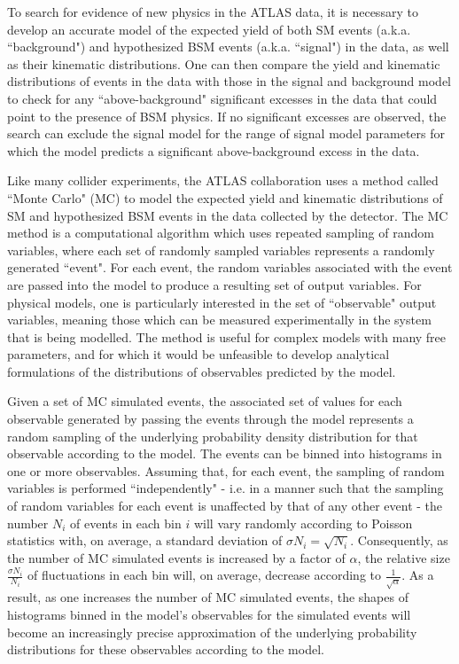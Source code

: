 \label{chapter:mc}

To search for evidence of new physics in the ATLAS data, it is necessary to develop an accurate model of the expected yield of both SM events (a.k.a. ``background") and hypothesized BSM events (a.k.a. ``signal") in the data, as well as their kinematic distributions. One can then compare the yield and kinematic distributions of events in the data with those in the signal and background model to check for any ``above-background" significant excesses in the data that could point to the presence of BSM physics. If no significant excesses are observed, the search can exclude the signal model for the range of signal model parameters for which the model predicts a significant above-background excess in the data.

Like many collider experiments, the ATLAS collaboration uses a method called ``Monte Carlo" (MC) to model the expected yield and kinematic distributions of SM and hypothesized BSM events in the data collected by the detector. The MC method is a computational algorithm which uses repeated sampling of random variables, where each set of randomly sampled variables represents a randomly generated ``event". For each event, the random variables associated with the event are passed into the model to produce a resulting set of output variables. For physical models, one is particularly interested in the set of ``observable" output variables, meaning those which can be measured experimentally in the system that is being modelled. The method is useful for complex models with many free parameters, and for which it would be unfeasible to develop analytical formulations of the distributions of observables predicted by the model. 

Given a set of MC simulated events, the associated set of values for each observable generated by passing the events through the model represents a random sampling of the underlying probability density distribution for that observable according to the model. The events can be binned into histograms in one or more observables. Assuming that, for each event, the sampling of random variables is performed ``independently" - i.e. in a manner such that the sampling of random variables for each event is unaffected by that of any other event - the number $N_i$ of events in each bin $i$ will vary randomly according to Poisson statistics with, on average, a standard deviation of $\sigma{N_i}=\sqrt{N_i}$. Consequently, as the number of MC simulated events is increased by a factor of $\alpha$, the relative size $\frac{\sigma{N_i}}{N_i}$ of fluctuations in each bin will, on average, decrease according to $\frac{1}{\sqrt{\alpha}}$. As a result, as one increases the number of MC simulated events, the shapes of histograms binned in the model's observables for the simulated events will become an increasingly precise approximation of the underlying probability distributions for these observables according to the model. 

